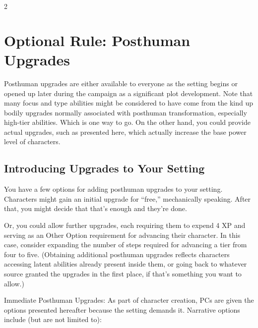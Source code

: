 \begin{multicols}{2}

\chapter{Optional Rule: Posthuman Upgrades}

Posthuman upgrades are either available to everyone as the setting begins or opened up later during the campaign as a significant plot development. Note that many focus and type abilities might be considered to have come from the kind up bodily upgrades normally associated with posthuman transformation, especially high-tier abilities. Which is one way to go. On the other hand, you could provide actual upgrades, such as presented here, which actually increase the base power level of characters. 

\section{Introducing Upgrades to Your Setting}

You have a few options for adding posthuman upgrades to your setting. Characters might gain an initial upgrade for “free,” mechanically speaking. After that, you might decide that that’s enough and they’re done. 

Or, you could allow further upgrades, each requiring them to expend 4 XP and serving as an Other Option requirement for advancing their character. In this case, consider expanding the number of steps required for advancing a tier from four to five. (Obtaining additional posthuman upgrades reflects characters accessing latent abilities already present inside them, or going back to whatever source granted the upgrades in the first place, if that’s something you want to allow.)

Immediate Posthuman Upgrades: As part of character creation, PCs are given the options presented hereafter because the setting demands it. Narrative options include (but are not limited to):


\end{multicols}
